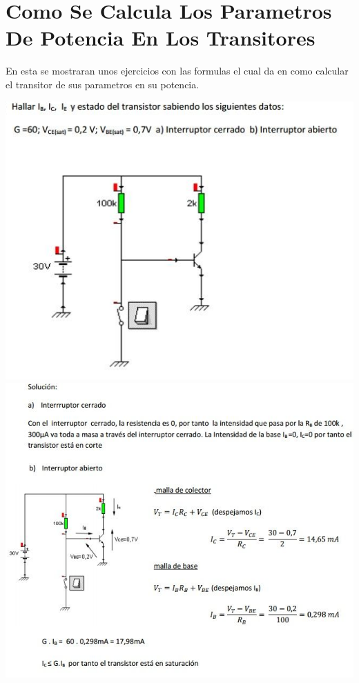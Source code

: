 \documentclass[10pt,a4paper]{article}
\begin{document}
\section{Como Se Calcula Los Parametros De Potencia En Los Transitores}
En esta se mostraran unos ejercicios con las formulas el cual da en como calcular el transitor de sus parametros en su potencia.
\begin{center}
\includegraphics[scale=0.8]{8.png}
\includegraphics[scale=0.6]{9.png}

\end{center}
\end{document}
